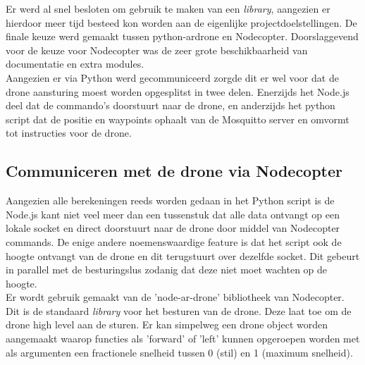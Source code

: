 Er werd al snel besloten om gebruik te maken van een \textit{library}, aangezien er hierdoor meer tijd besteed kon worden aan de eigenlijke projectdoelstellingen. De finale keuze werd gemaakt tussen python-ardrone en Nodecopter. Doorslaggevend voor de keuze voor Nodecopter was de zeer grote beschikbaarheid van documentatie en extra modules.\\

Aangezien er via Python werd gecommuniceerd zorgde dit er wel voor dat de drone aansturing moest worden opgesplitst in twee delen. Enerzijds het Node.js deel dat de commando's doorstuurt naar de drone, en anderzijds het python script dat de positie en waypoints ophaalt van de Mosquitto server en omvormt tot instructies voor de drone.

\subsection{Communiceren met de drone via Nodecopter}
Aangezien alle berekeningen reeds worden gedaan in het Python script is de Node.js kant niet veel meer dan een tussenstuk dat alle data ontvangt op een lokale socket en direct doorstuurt naar de drone door middel van Nodecopter commands. De enige andere noemenswaardige feature is dat het script ook de hoogte ontvangt van de drone en dit terugstuurt over dezelfde socket. Dit gebeurt in parallel met de besturingslus zodanig dat deze niet moet wachten op de hoogte.\\

Er wordt gebruik gemaakt van de 'node-ar-drone' bibliotheek van Nodecopter. Dit is de standaard \textit{library} voor het besturen van de drone. Deze laat toe om de drone high level aan de sturen. Er kan simpelweg een drone object worden aangemaakt waarop functies als 'forward' of 'left' kunnen opgeroepen worden met als argumenten een fractionele snelheid tussen 0 (stil) en 1 (maximum snelheid).\\

